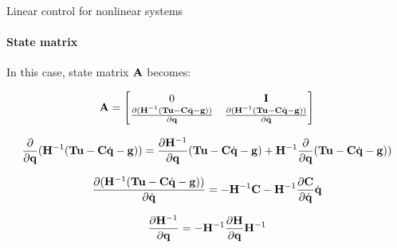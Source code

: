 \documentclass{beamer}
\begin{document}
\begin{frame}{Linear control for nonlinear systems}
\framesubtitle{State matrix}
\begin{flushleft}

In this case, state matrix $\mathbf{A}$ becomes:

\begin{equation}
    \mathbf{A} = 
    \begin{bmatrix}
    0 & \mathbf{I} \\
    \frac{\partial (\mathbf{H}^{-1} (\mathbf{T}\mathbf{u} -  \mathbf{C} \dot{\mathbf{q}} - \mathbf{g}) )}{\partial \mathbf{q}} 
    &
    \frac{\partial (\mathbf{H}^{-1} (\mathbf{T}\mathbf{u} -  \mathbf{C} \dot{\mathbf{q}} - \mathbf{g}) )}{\partial \dot{\mathbf{q}}}
    \end{bmatrix}
\end{equation}


\begin{equation*}
	\frac{\partial }{\partial \mathbf{q}} (\mathbf{H}^{-1} (\mathbf{T}\mathbf{u} -  \mathbf{C} \dot{\mathbf{q}} - \mathbf{g}) ) 
	= 
	\frac{\partial \mathbf{H}^{-1}}{\partial \mathbf{q}} (\mathbf{T}\mathbf{u} -  \mathbf{C} \dot{\mathbf{q}} - \mathbf{g})
	+ 
	\mathbf{H}^{-1} 
	\frac{\partial }{\partial \mathbf{q}} 
	(\mathbf{T}\mathbf{u} -  \mathbf{C} \dot{\mathbf{q}} - \mathbf{g}) )
\end{equation*}

\begin{equation}
	\frac{\partial (\mathbf{H}^{-1} (\mathbf{T}\mathbf{u} -  \mathbf{C} \dot{\mathbf{q}} - \mathbf{g}) )}{\partial \dot{\mathbf{q}}} 
	= 
	-\mathbf{H}^{-1}\mathbf{C} - \mathbf{H}^{-1} 
	\frac{\partial \mathbf{C}}{\partial \dot{\mathbf{q}}}  \dot{\mathbf{q}}
\end{equation}

\begin{equation}
	\frac{\partial \mathbf{H}^{-1}}{\partial \mathbf{q}} = 
	- \mathbf{H}^{-1} \frac{\partial \mathbf{H}}{\partial \mathbf{q}} 
	\mathbf{H}^{-1}
\end{equation}

\end{flushleft}
\end{frame}
\end{document}
